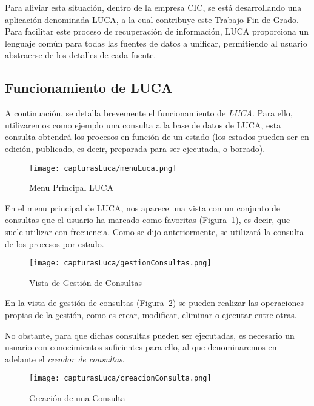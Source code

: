 Para aliviar esta situación, dentro de la empresa CIC, se está desarrollando una aplicación denominada LUCA, a la cual contribuye este Trabajo Fin de Grado. Para facilitar este proceso de recuperación de información, LUCA proporciona un lenguaje común para todas las fuentes de datos a unificar, permitiendo al usuario abstraerse de los detalles de cada fuente.

\subsection{Funcionamiento de LUCA}

A continuación, se detalla brevemente el funcionamiento de \emph{LUCA}. Para ello, utilizaremos como ejemplo una consulta a la base de datos de LUCA, esta consulta obtendrá los procesos en función de un estado (los estados pueden ser en edición, publicado, es decir, preparada para ser ejecutada, o borrado).

\begin{figure}[!tb]
    \centering
 	\texttt{[image: capturasLuca/menuLuca.png]}
	\caption{Menu Principal LUCA}
    \label{fig:menuLuca}
\end{figure}

En el menu principal de LUCA, nos aparece una vista con un conjunto de consultas que el usuario ha marcado como favoritas (Figura~\ref{fig:menuLuca}), es decir, que suele utilizar con frecuencia. Como se dijo anteriormente, se utilizará la consulta de los procesos por estado.

\begin{figure}[!tb]
	\centering
	\texttt{[image: capturasLuca/gestionConsultas.png]}
	\caption{Vista de Gestión de Consultas}
	\label{fig:gestionConsultas}
\end{figure}

En la vista de gestión de consultas (Figura~\ref{fig:gestionConsultas}) se pueden realizar las operaciones propias de la gestión, como es crear, modificar, eliminar o ejecutar entre otras.

No obstante, para que dichas consultas pueden ser ejecutadas, es necesario un usuario con conocimientos suficientes para ello, al que denominaremos en adelante el \emph{creador de consultas}.

\begin{figure}[!tb]
	\centering
	\texttt{[image: capturasLuca/creacionConsulta.png]}
	\caption{Creación de una Consulta}
	\label{fig:creacionConsulta}
\end{figure}

